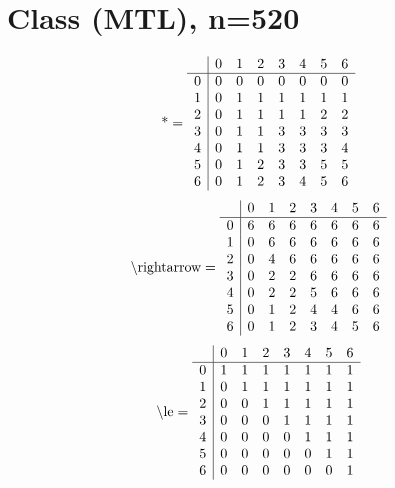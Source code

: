 \documentclass[11pt]{article}
\begin{document}
\section{Class (MTL), n=520}
\[\text{*} = 
\begin{array}{r | r r r r r r r}
 & 0 & 1 & 2 & 3 & 4 & 5 & 6 \\ \hline
0 & 0 & 0 & 0 & 0 & 0 & 0 & 0 \\
1 & 0 & 1 & 1 & 1 & 1 & 1 & 1 \\
2 & 0 & 1 & 1 & 1 & 1 & 2 & 2 \\
3 & 0 & 1 & 1 & 3 & 3 & 3 & 3 \\
4 & 0 & 1 & 1 & 3 & 3 & 3 & 4 \\
5 & 0 & 1 & 2 & 3 & 3 & 5 & 5 \\
6 & 0 & 1 & 2 & 3 & 4 & 5 & 6 \\
\end{array}
\]
\[\text{\textbackslash rightarrow} = 
\begin{array}{r | r r r r r r r}
 & 0 & 1 & 2 & 3 & 4 & 5 & 6 \\ \hline
0 & 6 & 6 & 6 & 6 & 6 & 6 & 6 \\
1 & 0 & 6 & 6 & 6 & 6 & 6 & 6 \\
2 & 0 & 4 & 6 & 6 & 6 & 6 & 6 \\
3 & 0 & 2 & 2 & 6 & 6 & 6 & 6 \\
4 & 0 & 2 & 2 & 5 & 6 & 6 & 6 \\
5 & 0 & 1 & 2 & 4 & 4 & 6 & 6 \\
6 & 0 & 1 & 2 & 3 & 4 & 5 & 6 \\
\end{array}
\]
\[\text{\textbackslash le} = 
\begin{array}{r | r r r r r r r}
 & 0 & 1 & 2 & 3 & 4 & 5 & 6 \\ \hline
0 & 1 & 1 & 1 & 1 & 1 & 1 & 1 \\
1 & 0 & 1 & 1 & 1 & 1 & 1 & 1 \\
2 & 0 & 0 & 1 & 1 & 1 & 1 & 1 \\
3 & 0 & 0 & 0 & 1 & 1 & 1 & 1 \\
4 & 0 & 0 & 0 & 0 & 1 & 1 & 1 \\
5 & 0 & 0 & 0 & 0 & 0 & 1 & 1 \\
6 & 0 & 0 & 0 & 0 & 0 & 0 & 1 \\
\end{array}
\]
\end{document}
